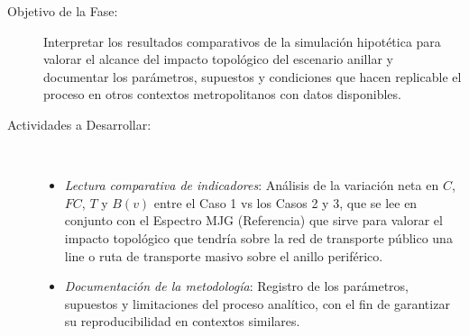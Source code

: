 \begin{description}
\item[Objetivo de la Fase:] Interpretar los resultados comparativos de la
simulación hipotética para valorar el alcance del impacto topológico del
escenario anillar y documentar los parámetros, supuestos y condiciones que
hacen replicable el proceso en otros contextos metropolitanos con datos
\gtfs{} disponibles.

    \item[Actividades a
    Desarrollar:]~\begin{itemize}
        \item \textit{Lectura comparativa de indicadores}: Análisis de la
        variación neta en $C$, $FC$, $T$ y $B(v)$ 
        entre el Caso 1 vs los Casos 2 y 3, 
        que se lee en conjunto con el Espectro MJG (Referencia) que sirve
        para valorar el impacto topológico que
        tendría sobre la red de transporte público una line o ruta de transporte masivo
        sobre el anillo periférico.
        \item \textit{Documentación de la metodología}: Registro de los
        parámetros, supuestos y limitaciones del proceso analítico, con el
        fin de garantizar su reproducibilidad en contextos similares.
    \end{itemize}
\end{description}
